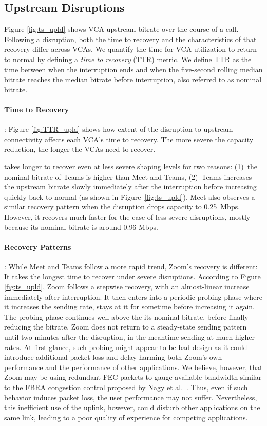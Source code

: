 \subsection{Upstream Disruptions}

Figure \ref{fig:ts_upld} shows VCA upstream bitrate over the course of a
call. Following a disruption, both the time to recovery and the
characteristics of that recovery
differ across VCAs. We quantify the time for
VCA utilization to return to normal by defining a 
\textit{time to recovery} (TTR) metric. We define TTR as the time between when the
interruption ends and when the five-second rolling median bitrate reaches the
median bitrate before interruption, also referred to as nominal bitrate. 

\paragraph{Time to Recovery}: Figure \ref{fig:TTR_upld} shows how extent of
the disruption to upstream connectivity affects each VCA's time to recovery.
The more severe the capacity reduction, the longer the VCAs need to recover.

\teams takes longer to recover even at less severe shaping levels for two
reasons: (1)~the nominal bitrate of Teams is higher than Meet and Teams,
(2)~Teams increases the upstream bitrate slowly immediately after the
interruption before increasing quickly back to normal (as shown in
Figure~\ref{fig:ts_upld}). Meet also observes a similar recovery pattern when
the disruption drops capacity to 0.25~Mbps. However, it recovers much faster
for the case of less severe disruptions, mostly because its nominal bitrate is
around 0.96 Mbps. 

\paragraph{Recovery Patterns}: While Meet and Teams follow a more rapid trend,
Zoom's recovery is different: It takes the longest time to recover under
severe disruptions. According to Figure \ref{fig:ts_upld}, Zoom follows a
stepwise recovery, with an almost-linear increase immediately after
interruption. It then enters into a periodic-probing phase where it increases
the sending rate, stays at it for sometime before increasing it again. The
probing phase continues well above the its nominal bitrate, before finally
reducing the bitrate.  Zoom does not return to a steady-state sending pattern
until two minutes after the disruption, in the meantime sending at much higher
rates. At first glance, such probing might appear to be bad design as it could
introduce additional packet loss and delay harming both Zoom's own performance
and the performance of other applications.  We believe, however, that Zoom may
be using redundant FEC packets to gauge available bandwidth similar to the
FBRA congestion control proposed by Nagy et al.~\cite{nagy2014congestion}.
Thus, even if such behavior induces packet loss, the user performance may not
suffer. Nevertheless, this inefficient use of the uplink, however, could
disturb other applications on the same link, leading to a poor quality of
experience for competing applications. 

